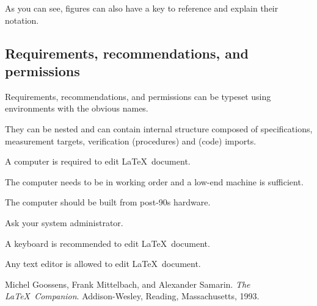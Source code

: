 \documentclass{metanorma}
\begin{document}
As you can see, figures can also have a key to reference and explain their notation.


\subsection{Requirements, recommendations, and permissions}

Requirements, recommendations, and permissions can be typeset using environments with the obvious names.

They can be nested and can contain internal structure composed of specifications, measurement targets, verification (procedures) and (code) imports.

\begin{requirement}
  A computer is required to edit \LaTeX\ document.

  \begin{specification}
    The computer needs to be in working order and a low-end machine is sufficient.
  \end{specification}

  \begin{measurement-target}
    The computer should be built from post-90s hardware.
  \end{measurement-target}

  \begin{verification}
    Ask your system administrator.
  \end{verification}
\end{requirement}

\begin{recommendation}
  A keyboard is recommended to edit \LaTeX\ document.
\end{recommendation}

\begin{permission}
  Any text editor is allowed to edit \LaTeX\ document.
\end{permission}

\begin{thebibliography}{1}
    Michel Goossens, Frank Mittelbach, and Alexander Samarin. 
    \textit{The \LaTeX\ Companion}. 
    Addison-Wesley, Reading, Massachusetts, 1993.
\end{thebibliography}  
\end{document}
